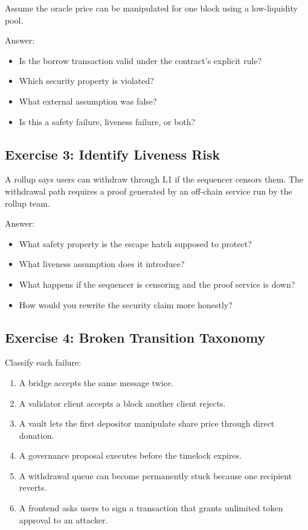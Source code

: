 Assume the oracle price can be manipulated for one block using a
low-liquidity pool.

Answer:

\begin{itemize}
\tightlist
\item
  Is the borrow transaction valid under the contract's explicit rule?
\item
  Which security property is violated?
\item
  What external assumption was false?
\item
  Is this a safety failure, liveness failure, or both?
\end{itemize}

\subsection{Exercise 3: Identify Liveness Risk}

A rollup says users can withdraw through L1 if the sequencer censors
them. The withdrawal path requires a proof generated by an off-chain
service run by the rollup team.

Answer:

\begin{itemize}
\tightlist
\item
  What safety property is the escape hatch supposed to protect?
\item
  What liveness assumption does it introduce?
\item
  What happens if the sequencer is censoring and the proof service is
  down?
\item
  How would you rewrite the security claim more honestly?
\end{itemize}

\subsection{Exercise 4: Broken Transition Taxonomy}

Classify each failure:

\begin{enumerate}
\def\labelenumi{\arabic{enumi}.}
\tightlist
\item
  A bridge accepts the same message twice.
\item
  A validator client accepts a block another client rejects.
\item
  A vault lets the first depositor manipulate share price through direct
  donation.
\item
  A governance proposal executes before the timelock expires.
\item
  A withdrawal queue can become permanently stuck because one recipient
  reverts.
\item
  A frontend asks users to sign a transaction that grants unlimited
  token approval to an attacker.
\end{enumerate}


